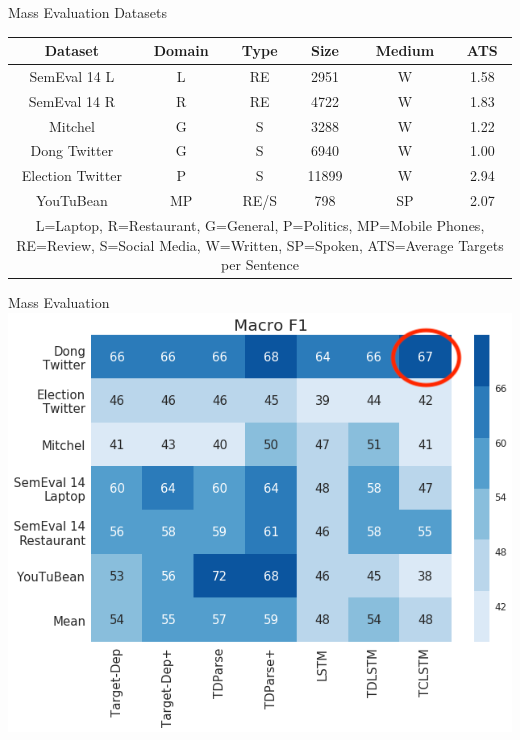 \documentclass[10pt]{beamer}
\begin{document}
\begin{frame}{Mass Evaluation Datasets}
\centering
    \begin{tabular}{|c|c|c|c|c|c|}
            \hline
            Dataset & Domain & Type & Size & Medium & ATS\\
            \hline
            \hline
            SemEval 14 L& L & RE & 2951 & W & 1.58 \\
            \hline
            SemEval 14 R& R & RE & 4722 & W & 1.83 \\
            \hline
            Mitchel & G & S & 3288 & W & 1.22  \\
            \hline
        Dong Twitter& G & S & 6940 & W & 1.00 \\
            \hline
            Election Twitter& P & S & 11899 & W & 2.94 \\
            \hline
            YouTuBean& MP & RE/S& 798 & SP & 2.07 \\
            \hline
            \hline
            \multicolumn{6}{|p{\linewidth}|}{L=Laptop, R=Restaurant, G=General, P=Politics, MP=Mobile Phones, RE=Review, S=Social Media, W=Written, SP=Spoken, ATS=Average Targets per Sentence}\\
            \hline
        \end{tabular}
\end{frame}

\begin{frame}{Mass Evaluation}
\centering
\includegraphics[scale=0.45]{mass_eval1.png}
\end{frame}
\end{document}
